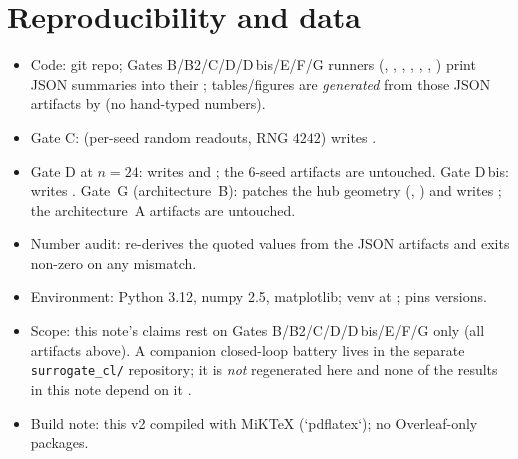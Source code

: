 \documentclass[10pt,a4paper]{article}
\begin{document}
\section{Reproducibility and data}\label{sec:repro}
\begin{itemize}[nosep]
\item Code:  git repo; Gates B/B2/C/D/D\,bis/E/F/G runners
(, , ,
, ,
, ) print JSON summaries
into their ;
tables/figures are \emph{generated} from those JSON artifacts by
 (no hand-typed numbers).
\item Gate C:  (per-seed random readouts,
RNG $4242$) writes .
\item Gate D at $n=24$:  writes
 and
; the $6$-seed artifacts are untouched.
Gate D\,bis:  writes
.
Gate~G (architecture~B):  patches the hub
geometry (, ) and writes
; the architecture~A artifacts are untouched.
\item Number audit:  re-derives the
quoted values from the JSON artifacts and exits non-zero on any
mismatch.
\item Environment: Python \SI{3.12}{}, numpy \SI{2.5}{},
matplotlib; venv at ; 
pins versions.
\item Scope: this note's claims rest on Gates B/B2/C/D/D\,bis/E/F/G only
(all artifacts above). A companion closed-loop battery lives in the
separate \texttt{surrogate\_cl/} repository; it is \emph{not}
regenerated here and none of the results in this note depend on it
\cite{embodied_neurocomp}.
\item Build note: this v2 compiled with MiKTeX (`pdflatex`); no
Overleaf-only packages.
\end{itemize}
\end{document}
